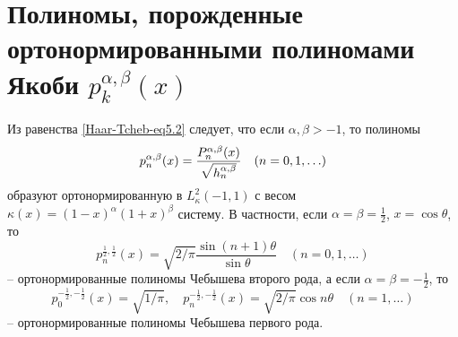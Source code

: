 


\section{Полиномы, порожденные  ортонормированными полиномами \\ Якоби $p_{k}^{\alpha,\beta}(x)$}
Из равенства \eqref{Haar-Tcheb-eq5.2} следует, что если $\alpha,\beta>-1$, то полиномы
\begin{equation}\label{sob-leg-3.32}
p_n^{\alpha,\beta}(x)={P_n^{\alpha,\beta}(x)\over\sqrt{ h_n^{\alpha,\beta}}}\quad(n=0,1,\ldots)
\end{equation}
образуют ортонормированную  в $L_\kappa^2(-1,1)$ с весом $\kappa(x)=(1-x)^\alpha(1+x)^\beta$ систему. В частности, если $\alpha=\beta=\frac12$, $x=\cos\theta$, то
$$
 p_n^{\frac12,\frac12}(x)=\sqrt{2/\pi}\frac{\sin(n+1)\theta}{\sin\theta}\quad (n=0,1,\ldots)
 $$
 -- ортонормированные полиномы Чебышева второго рода, а если $\alpha=\beta=-\frac12$, то
$$
p_0^{-\frac12,-\frac12}(x)=\sqrt{1/\pi},\quad  p_n^{-\frac12,-\frac12}(x)=\sqrt{2/\pi}\cos n\theta\quad (n=1,\ldots)
 $$
 -- ортонормированные полиномы Чебышева первого рода.



